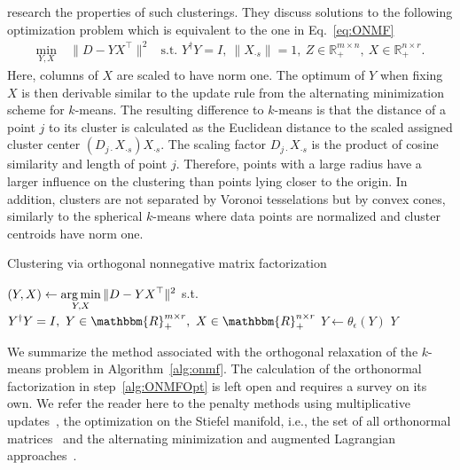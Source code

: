 \cite{pompili2014ONMF} research the properties of such clusterings. They discuss solutions to the following optimization problem which is equivalent to the one in Eq.~\eqref{eq:ONMF}
\begin{align*}
     \min_{Y,X} &\ \|D-YX^\top\|^2 &\text{s.t. } Y^\dagger Y=I,\ 
     \|X_{\cdot s}\|=1,\ 
     Z\in\mathbb{R}_+^{m\times n},\ X\in\mathbb{R}_+^{n\times r}.
\end{align*}
Here, columns of $X$ are scaled to have norm one. The optimum of $Y$ when fixing $X$ is then derivable similar to the update rule from the alternating minimization scheme for $k$-means. The resulting difference to $k$-means is that the distance of a point $j$ to its cluster is calculated as the Euclidean distance to the scaled assigned cluster center $(D_{j\cdot}X_{\cdot s})X_{\cdot s}$. The scaling factor $D_{j\cdot}X_{\cdot s}$ is the product of cosine similarity and length of point $j$. Therefore, points with a large radius have a larger influence on the clustering than points lying closer to the origin. In addition, clusters are not separated by Voronoi tesselations but by convex cones, similarly to the spherical $k$-means where data points are normalized and cluster centroids have norm one. 
\begin{algorithm}[t]
\caption{Clustering via orthogonal nonnegative matrix factorization} 
\begin{algorithmic}[1]
  \Function{ONMF}{$D,r,\epsilon$} \Comment{$\epsilon\gtrsim 0$}
  \State $\displaystyle (Y,X)\gets \operatorname*{arg\,min}_{Y,X}\|D-YX^\top\|^2$ s.t. $Y^\dagger Y=I,\ Y\in\mathbbm{R}_+^{m\times r},\ X\in\mathbbm{R}_+^{n\times r}$\label{alg:ONMFOpt}
  \State $Y\gets \theta_\epsilon(Y)$
  \State \Return $Y$
  \EndFunction
\end{algorithmic}
\label{alg:onmf}
\end{algorithm}
We summarize the method associated with the orthogonal relaxation of the $k$-means problem in Algorithm~\ref{alg:onmf}. The calculation of the orthonormal factorization in step~\ref{alg:ONMFOpt} is left open and requires a survey on its own. We refer the reader here to the penalty methods using multiplicative updates~\citep{ding2006orthogonal, li2006relationships}, the optimization on the Stiefel manifold, i.e., the set of all orthonormal matrices~\citep{yoo2010orthogonal} and the alternating minimization and augmented Lagrangian approaches~\citep{pompili2014ONMF}.
